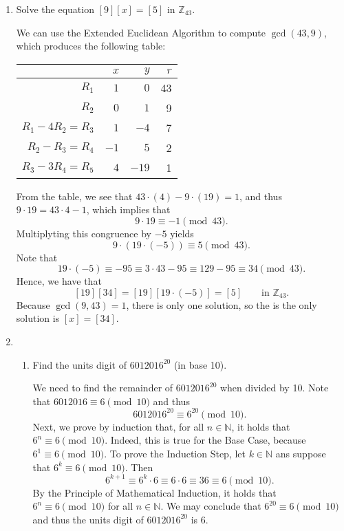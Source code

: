 \documentclass[11pt]{article}
\def\naturals{\mathbb{N}}
\def\integers{\mathbb{Z}}
\begin{document}
\begin{enumerate}
\begin{enumerate}
\begin{Solution}
 \end{Solution}
\end{enumerate}

\item  Solve the equation $[9][x] = [5]$ in $\integers_{43}$. 
\begin{Solution}
 We can use the Extended Euclidean Algorithm to compute $\gcd(43,9)$, which produces the following table:
\begin{center}
\begin{tabular}{|r|r|r|r|}
\hline
 & $x$ & $y$ & $r$\\\hline
 $R_1$             &   $1$ &   $0$ & 43\\
 $R_2$             &   $0$ &   $1$ &  9\\
 $R_1 -4R_2 = R_3$ &   $1$ &  $-4$ &  7\\
 $R_2  -R_3 = R_4$ &  $-1$ &  $ 5$ &  2\\
 $R_3 -3R_4 = R_5$ &   $4$ & $-19$ &  1\\\hline
\end{tabular}
\end{center}
From the table, we see that $43\cdot(4) - 9\cdot(19) = 1$, and thus $9\cdot 19 = 43\cdot 4 -1$, which implies that \[9\cdot 19\equiv -1\pmod{43}.\]
Multiplyting this congruence by $-5$ yields
\[
 9\cdot (19\cdot(-5)) \equiv 5\pmod{43}.
\]
Note that
\[
 19\cdot(-5) \equiv -95 \equiv 3\cdot 43 - 95 \equiv 129 - 95 \equiv 34 \pmod{43}.
\]
Hence, we have that
\[
 [19][34] = [19][19\cdot(-5)] = [5] \qquad\text{in }\integers_{43}.
\]
Because $\gcd(9,43)=1$, there is only one solution, so the is the only solution is $[x]=[34]$.
\end{Solution}


\item
\begin{enumerate}
\item Find the units digit of $6012016^{20}$ (in base 10).
\begin{Solution}
 We need to find the remainder of $6012016^{20}$ when divided by 10. Note that $6012016\equiv 6\pmod{10}$ and thus
 \[
  6012016^{20}\equiv 6^{20} \pmod{10}.
 \]
Next, we prove by induction that, for all $n\in\naturals$, it holds that $6^n\equiv 6\pmod{10}$. Indeed, this is true for the Base Case, because $6^1\equiv 6 \pmod{10}$. To prove the Induction Step, let $k\in\naturals$ ans suppose that $6^k\equiv 6\pmod{10}$. Then 
\[
 6^{k+1} \equiv 6^k\cdot 6 \equiv 6\cdot 6\equiv 36 \equiv 6\pmod{10}.
\]
By the Principle of Mathematical Induction, it holds that $6^n\equiv 6\pmod{10}$ for all $n\in\naturals$. We may conclude that $6^{20} \equiv 6\pmod{10}$ and thus the units digit of $6012016^{20}$ is $6$.
\end{Solution}


\end{enumerate}
\end{enumerate}
\end{document}
